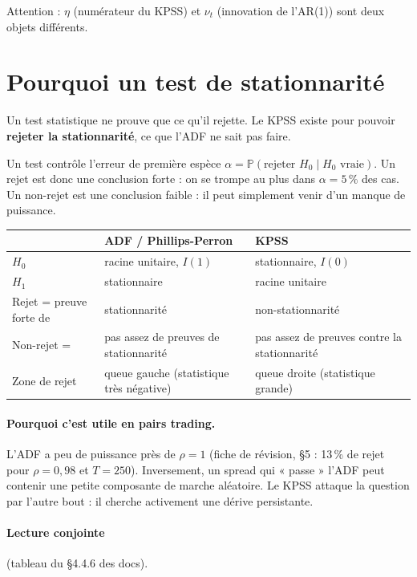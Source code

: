 \documentclass[11pt,a4paper]{article}
\theoremstyle{definition}
\begin{document}
Attention : $\eta$ (numérateur du KPSS) et $\nu_t$ (innovation de l'AR(1)) sont deux objets différents.

\section{Pourquoi un test de stationnarité}

Un test statistique ne prouve que ce qu'il rejette. Le KPSS existe pour pouvoir \textbf{rejeter la stationnarité}, ce que l'ADF ne sait pas faire.

Un test contrôle l'erreur de première espèce $\alpha = \mathbb{P}(\text{rejeter } H_0 \mid H_0 \text{ vraie})$. Un rejet est donc une conclusion forte : on se trompe au plus dans $\alpha = 5\,\%$ des cas. Un non-rejet est une conclusion faible : il peut simplement venir d'un manque de puissance.

\begin{center}
\begin{tabularx}{\textwidth}{@{}lXX@{}}
\toprule
 & ADF / Phillips-Perron & KPSS \\
\midrule
$H_0$ & racine unitaire, $I(1)$ & stationnaire, $I(0)$ \\
$H_1$ & stationnaire & racine unitaire \\
Rejet = preuve forte de & stationnarité & non-stationnarité \\
Non-rejet = & pas assez de preuves de stationnarité & pas assez de preuves contre la stationnarité \\
Zone de rejet & queue gauche (statistique très négative) & queue droite (statistique grande) \\
\bottomrule
\end{tabularx}
\end{center}

\paragraph{Pourquoi c'est utile en pairs trading.} L'ADF a peu de puissance près de $\rho = 1$ (fiche de révision, \S5 : 13\,\% de rejet pour $\rho = 0{,}98$ et $T = 250$). Inversement, un spread qui « passe » l'ADF peut contenir une petite composante de marche aléatoire. Le KPSS attaque la question par l'autre bout : il cherche activement une dérive persistante.

\paragraph{Lecture conjointe} (tableau du \S4.4.6 des docs).
\end{document}
